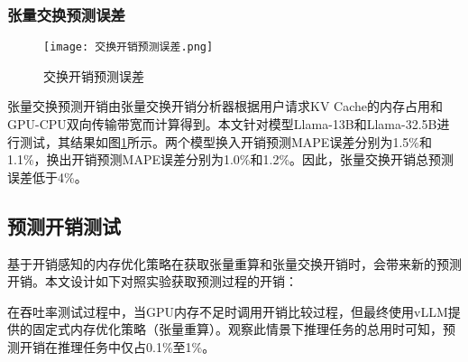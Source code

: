 
\subsubsection{张量交换预测误差}

\begin{figure}[!htbp]
  \centering
  \texttt{[image: 交换开销预测误差.png]}
  \caption{交换开销预测误差}
  \label{Fig:交换开销预测误差}
\end{figure}

张量交换预测开销由张量交换开销分析器根据用户请求KV Cache的内存占用和GPU-CPU双向传输带宽而计算得到。本文针对模型Llama-13B和Llama-32.5B进行测试，其结果如图\ref{Fig:交换开销预测误差}所示。两个模型换入开销预测MAPE误差分别为1.5\%和1.1\%，换出开销预测MAPE误差分别为1.0\%和1.2\%。因此，张量交换开销总预测误差低于4\%。

\subsection{预测开销测试}

基于开销感知的内存优化策略在获取张量重算和张量交换开销时，会带来新的预测开销。本文设计如下对照实验获取预测过程的开销：

在吞吐率测试过程中，当GPU内存不足时调用开销比较过程，但最终使用vLLM提供的固定式内存优化策略（张量重算）。观察此情景下推理任务的总用时可知，预测开销在推理任务中仅占0.1\%至1\%。


